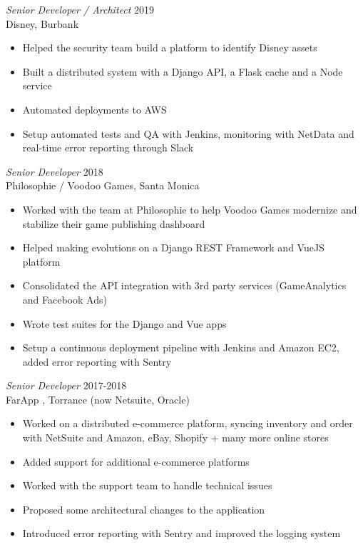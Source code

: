 \documentclass[line,resmargin]{res}
\begin{document}
\begin{resume}
{\sl Senior Developer / Architect\/} \hfill 2019\\
Disney, Burbank
\begin{itemize} \itemsep -2pt
\item Helped the security team build a platform to identify Disney assets
\item Built a distributed system with a Django API, a Flask cache and a Node service
\item Automated deployments to AWS
\item Setup automated tests and QA with Jenkins, monitoring with NetData and real-time error reporting through Slack
\end{itemize}

{\sl Senior Developer\/} \hfill 2018\\
Philosophie / Voodoo Games, Santa Monica
\begin{itemize} \itemsep -2pt
\item Worked with the team at Philosophie to help Voodoo Games modernize and stabilize their game publishing dashboard
\item Helped making evolutions on a Django REST Framework and VueJS platform
\item Consolidated the API integration with 3rd party services (GameAnalytics and Facebook Ads)
\item Wrote test suites for the Django and Vue apps
\item Setup a continuous deployment pipeline with Jenkins and Amazon EC2, added error reporting with Sentry
\end{itemize}

{\sl Senior Developer\/} \hfill 2017-2018\\
FarApp , Torrance (now Netsuite, Oracle)
\begin{itemize} \itemsep -2pt
\item Worked on a distributed e-commerce platform, syncing inventory and order with NetSuite and Amazon, eBay, Shopify + many more online stores
\item Added support for additional e-commerce platforms
\item Worked with the support team to handle technical issues
\item Proposed some architectural changes to the application
\item Introduced error reporting with Sentry and improved the logging system
\end{itemize}


\end{resume}
\end{document}
